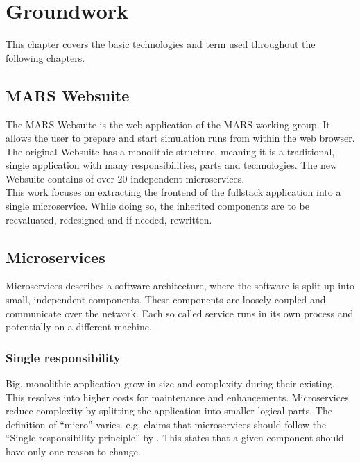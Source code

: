 
\chapter{Groundwork}
This chapter covers the basic technologies and term used throughout the following chapters.



\section{MARS Websuite}
The MARS Websuite is the web application of the MARS working group. It allows the user to prepare and start simulation runs from within the web browser.\\
The original Websuite has a monolithic structure, meaning it is a traditional, single application with many responsibilities, parts and technologies. The new Websuite contains of over 20 independent microservices.\\
This work focuses on extracting the frontend of the fullstack application into a single microservice. While doing so, the inherited components are to be reevaluated, redesigned and if needed, rewritten.



\section{Microservices}
\label{sec:microservices}
Microservices describes a software architecture, where the software is split up into small, independent components. These components are loosely coupled and communicate over the network. Each so called service runs in its own process and potentially on a different machine.


\subsection{Single responsibility}
Big, monolithic application grow in size and complexity during their existing. This resolves into higher costs for maintenance and enhancements. Microservices reduce complexity by splitting the application into smaller logical parts. The definition of \enquote{micro} varies. \cite{newman2015building} e.g. claims that microservices should follow the \enquote{Single responsibility principle} by \cite{martin2003agile}. This states that a given component should have only one reason to change.


